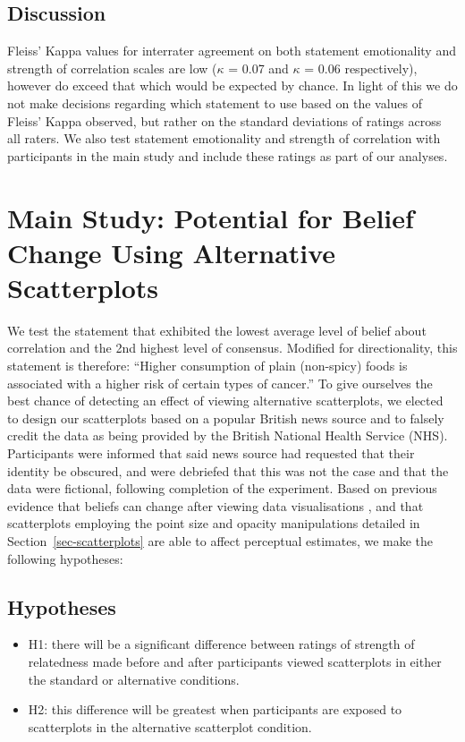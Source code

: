 \documentclass[manuscript,screen,review,anonymous]{acmart}
\providecommand{\tightlist}{%
  \setlength{\itemsep}{0pt}\setlength{\parskip}{0pt}}\usepackage{longtable,booktabs,array}
\begin{document}
\subsection{Discussion}\label{sec-discussion-pre}

Fleiss' Kappa values for interrater agreement on both statement
emotionality and strength of correlation scales are low (\(\kappa\) =
0.07 and \(\kappa\) = 0.06 respectively), however do exceed that which
would be expected by chance. In light of this we do not make decisions
regarding which statement to use based on the values of Fleiss' Kappa
observed, but rather on the standard deviations of ratings across all
raters. We also test statement emotionality and strength of correlation
with participants in the main study and include these ratings as part of
our analyses.

\section{Main Study: Potential for Belief Change Using Alternative
Scatterplots}\label{sec-main-study}

We test the statement that exhibited the lowest average level of belief
about correlation and the 2nd highest level of consensus. Modified for
directionality, this statement is therefore: ``Higher consumption of
plain (non-spicy) foods is associated with a higher risk of certain
types of cancer.'' To give ourselves the best chance of detecting an
effect of viewing alternative scatterplots, we elected to design our
scatterplots based on a popular British news source and to falsely
credit the data as being provided by the British National Health Service
(NHS). Participants were informed that said news source had requested
that their identity be obscured, and were debriefed that this was not
the case and that the data were fictional, following completion of the
experiment. Based on previous evidence that beliefs can change after
viewing data visualisations \citep{karduni_2020, markant_2023}, and that
scatterplots employing the point size and opacity manipulations detailed
in Section~\ref{sec-scatterplots} are able to affect perceptual
estimates, we make the following hypotheses:

\subsection{Hypotheses}\label{hypotheses}

\begin{itemize}
\tightlist
\item
  H1: there will be a significant difference between ratings of strength
  of relatedness made before and after participants viewed scatterplots
  in either the standard or alternative conditions.
\item
  H2: this difference will be greatest when participants are exposed to
  scatterplots in the alternative scatterplot condition.
\end{itemize}
\end{document}
